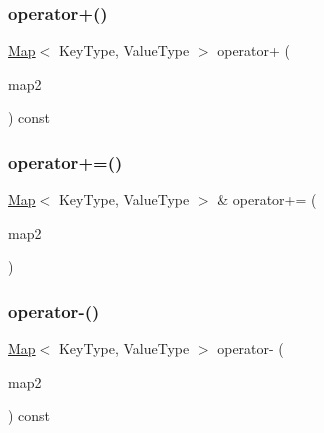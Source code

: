 \mbox{\label{classMap_af25292376af863c7defa9dd9a378d383}} 
\subsubsection{\texorpdfstring{operator+()}{operator+()}}
{\footnotesize\ttfamily \mbox{\hyperlink{classMap}{Map}}$<$ Key\+Type, Value\+Type $>$ operator+ (\begin{DoxyParamCaption}\item[{const \mbox{\hyperlink{classMap}{Map}}$<$ Key\+Type, Value\+Type $>$ \&}]{map2 }\end{DoxyParamCaption}) const}

\mbox{\label{classMap_ac0478d198f73f2a6c45c03e453faa538}} 
\subsubsection{\texorpdfstring{operator+=()}{operator+=()}}
{\footnotesize\ttfamily \mbox{\hyperlink{classMap}{Map}}$<$ Key\+Type, Value\+Type $>$ \& operator+= (\begin{DoxyParamCaption}\item[{const \mbox{\hyperlink{classMap}{Map}}$<$ Key\+Type, Value\+Type $>$ \&}]{map2 }\end{DoxyParamCaption})}

\mbox{\label{classMap_a68704368f8cfa5ea173c0dfc95c75920}} 
\subsubsection{\texorpdfstring{operator-\/()}{operator-()}}
{\footnotesize\ttfamily \mbox{\hyperlink{classMap}{Map}}$<$ Key\+Type, Value\+Type $>$ operator-\/ (\begin{DoxyParamCaption}\item[{const \mbox{\hyperlink{classMap}{Map}}$<$ Key\+Type, Value\+Type $>$ \&}]{map2 }\end{DoxyParamCaption}) const}

\mbox{\label{classMap_a5c6ee663a9c3956c53220cfff8659f1c}} 
